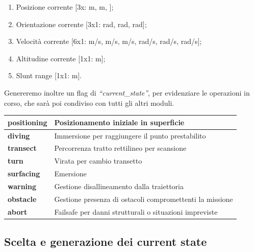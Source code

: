 \documentclass{article}
\begin{document}
        \begin{enumerate}
            \item Posizione corrente [3x: m, m, \degree];
            \item Orientazione corrente [3x1: rad, rad, rad];
            \item Velocità corrente [6x1: m/s, m/s, m/s, rad/s, rad/s, rad/s];
            \item Altitudine corrente [1x1: m];
            \item Slunt range [1x1: m].
        \end{enumerate}

        \noindent
        Genereremo inoltre un flag di \textit{“current\_state”}, per evidenziare le operazioni in corso, che sarà poi condiviso con tutti gli altri moduli.

        \begin{center}
            \begin{tabular}{|l|l|}
                \hline
                \textbf{positioning} & Posizionamento iniziale in superficie\\
                \hline
                \textbf{diving} & Immersione per raggiungere il punto prestabilito\\
                \hline
                \textbf{transect} & Percorrenza tratto rettilineo per scansione\\
                \hline
                \textbf{turn} & Virata per cambio transetto\\
                \hline
                \textbf{surfacing} & Emersione\\
                \hline
                \textbf{warning} & Gestione disallineamento dalla traiettoria\\
                \hline
                \textbf{obstacle} & Gestione presenza di ostacoli compromettenti la missione\\
                \hline
                \textbf{abort} & Failsafe per danni strutturali o situazioni impreviste\\
                \hline
            \end{tabular}
        \end{center}
        
        \vspace{1cm}
        \subsection{Scelta e  generazione dei current state}
\end{document}
